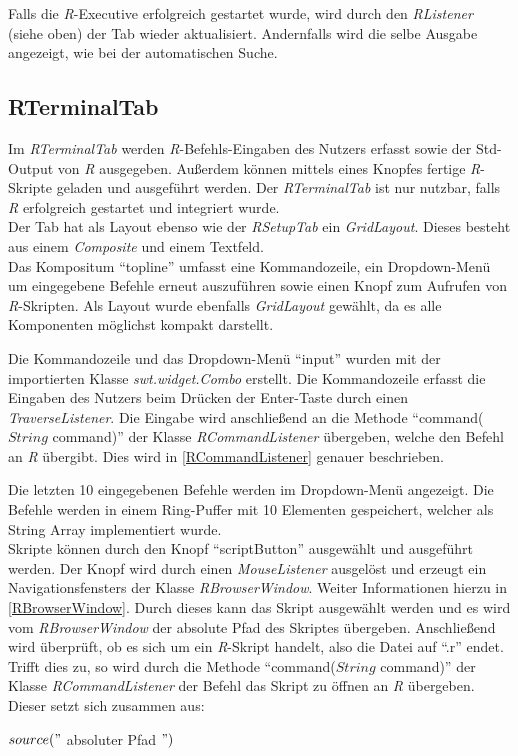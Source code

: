 \documentclass[a4paper, 12pt]{report} %
\begin{document}
Falls die \textit{R}-Executive erfolgreich gestartet wurde, wird durch den \textit{RListener} (siehe oben) der Tab wieder aktualisiert. Andernfalls wird die selbe Ausgabe angezeigt, wie bei der automatischen Suche.

\subsection{RTerminalTab} \label{RTerminal}

Im \textit{RTerminalTab} werden \textit{R}-Befehls-Eingaben des Nutzers erfasst sowie der Std-Output von \textit{R} ausgegeben. Außerdem können mittels eines Knopfes fertige \textit{R}-Skripte geladen und ausgeführt werden. Der \textit{RTerminalTab} ist nur nutzbar, falls \textit{R} erfolgreich gestartet und integriert wurde.\\

Der Tab hat als Layout ebenso wie der \textit{RSetupTab} ein \textit{GridLayout}.
Dieses besteht aus einem \textit{Composite} und einem Textfeld.\\

Das Kompositum "`topline"' umfasst eine Kommandozeile, ein Dropdown-Menü um eingegebene Befehle erneut auszuführen sowie einen Knopf zum Aufrufen von \textit{R}-Skripten. Als Layout wurde ebenfalls \textit{GridLayout} gewählt, da es alle Komponenten möglichst kompakt darstellt.

Die Kommandozeile und das Dropdown-Menü "`input"' wurden mit der importierten Klasse \textit{swt.widget.Combo} erstellt. Die Kommandozeile erfasst die Eingaben des Nutzers beim Drücken der Enter-Taste durch einen \textit{TraverseListener}. Die Eingabe wird anschließend an die Methode "`command($String$ command)"' der Klasse  \textit{RCommandListener} übergeben, welche den Befehl an \textit{R} übergibt. Dies wird in \ref{RCommandListener} genauer beschrieben.

Die letzten 10 eingegebenen Befehle werden im Dropdown-Menü angezeigt. Die Befehle werden in einem Ring-Puffer mit 10 Elementen gespeichert, welcher als String Array implementiert wurde.\\

Skripte können durch den Knopf "`scriptButton"' ausgewählt und ausgeführt werden. Der Knopf wird durch einen \textit{MouseListener} ausgelöst und erzeugt ein Navigationsfensters der Klasse \textit{RBrowserWindow}. Weiter Informationen hierzu in \ref{RBrowserWindow}. Durch dieses kann das Skript ausgewählt werden und es wird vom \textit{RBrowserWindow} der absolute Pfad des Skriptes übergeben. Anschließend wird überprüft, ob es sich um ein \textit{R}-Skript handelt, also die Datei auf "`.r"' endet. Trifft dies zu, so wird durch die Methode "`command($String$ command)"' der Klasse  \textit{RCommandListener} der Befehl das Skript zu öffnen an \textit{R} übergeben. Dieser setzt sich zusammen aus:
\begin{center}
$source("$  absoluter Pfad $")$
\end{center}
\end{document}
